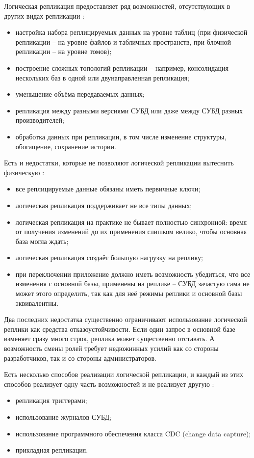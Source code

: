 Логическая репликация предоставляет ряд возможностей, отсутствующих в других видах репликации \autocite{PhysLogPeplic}:
\begin{itemize}
    \item настройка набора реплицируемых данных на уровне таблиц (при физической репликации – на уровне файлов и табличных пространств, при блочной репликации – на уровне томов);
    \item построение сложных топологий репликации – например, консолидация нескольких баз в одной или двунаправленная репликация;
    \item уменьшение объёма передаваемых данных;
    \item репликация между разными версиями СУБД или даже между СУБД разных производителей;
    \item обработка данных при репликации, в том числе изменение структуры, обогащение, сохранение истории.
\end{itemize}

Есть и недостатки, которые не позволяют логической репликации вытеснить физическую \autocite{PhysLogPeplic}:
\begin{itemize}
    \item все реплицируемые данные обязаны иметь первичные ключи;
    \item логическая репликация поддерживает не все типы данных;
    \item логическая репликация на практике не бывает полностью синхронной: время от получения изменений до их применения слишком велико, чтобы основная база могла ждать;
    \item логическая репликация создаёт большую нагрузку на реплику;
    \item при переключении приложение должно иметь возможность убедиться, что все изменения с основной базы, применены на реплике – СУБД зачастую сама не может этого определить, так как для неё режимы реплики и основной базы эквивалентны.
\end{itemize}

Два последних недостатка существенно ограничивают использование логической реплики как средства отказоустойчивости. Если
один запрос в основной базе изменяет сразу много строк, реплика может существенно отставать. А возможность смены ролей
требует недюжинных усилий как со стороны разработчиков, так и со стороны администраторов.

Есть несколько способов реализации логической репликации, и каждый из этих способов реализует одну часть возможностей и
не реализует другую \autocite{PhysLogPeplic}:
\begin{itemize}
    \item репликация триггерами;
    \item использование журналов СУБД;
    \item использование программного обеспечения класса CDC (change data capture);
    \item прикладная репликация.
\end{itemize}

